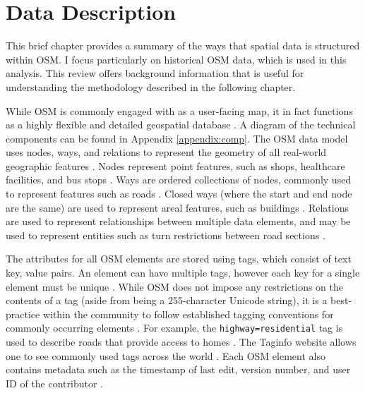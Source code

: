 \chapter{Data Description}
\label{chapterlabel3}
This brief chapter provides a summary of the ways that spatial data is structured within OSM. I focus particularly on historical OSM data, which is used in this analysis. This review offers background information that is useful for understanding the methodology described in the following chapter. 

While OSM is commonly engaged with as a user-facing map, it in fact functions as a highly flexible and detailed geospatial database \parencite{openstreetmap_wiki_component_2018}. A diagram of the technical components can be found in Appendix \ref{appendix:comp}. The OSM data model uses nodes, ways, and relations to represent the geometry of all real-world geographic features \parencite{openstreetmap_wiki_elements_2020}. Nodes represent point features, such as shops, healthcare facilities, and bus stops \parencite{openstreetmap_wiki_node_2019}. Ways are ordered collections of nodes, commonly used to represent features such as roads \parencite{openstreetmap_wiki_way_2020}. Closed ways (where the start and end node are the same) are used to represent areal features, such as buildings \parencite{openstreetmap_wiki_way_2020}. Relations are used to represent relationships between multiple data elements, and may be used to represent entities such as turn restrictions between road sections \parencite{openstreetmap_wiki_relation_2019}. 


The attributes for all OSM elements are stored using tags, which consist of text key, value pairs. An element can have multiple tags, however each key for a single element must be unique \parencite{openstreetmap_wiki_tags_2020}. While OSM does not impose any restrictions on the contents of a tag (aside from being a 255-character Unicode string), it is a best-practice within the community to follow established tagging conventions for commonly occurring elements \parencite{openstreetmap_wiki_tags_2020}. For example, the \texttt{highway=residential} tag is used to describe roads that provide access to homes \parencite{openstreetmap_wiki_elements_2020}. The Taginfo website allows one to see commonly used tags across the world \parencite{openstreetmap_contributors_openstreetmap_2020}. Each OSM element also contains metadata such as the timestamp of last edit, version number, and user ID of the contributor \parencite{openstreetmap_wiki_elements_2020}. 



